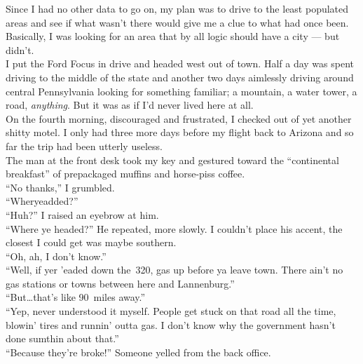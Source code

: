 \documentclass[a5paper]{scrartcl}
\begin{document}
Since I had no other data to go on, my plan was to drive to the least populated areas and see if what wasn't there would give me a clue to what had once been. Basically, I was looking for an area that by all logic should have a city --- but didn't.\\


I put the Ford Focus in drive and headed west out of town.
Half a day was spent driving to the middle of the state and another two days aimlessly driving around central Pennsylvania looking for something familiar; a mountain, a water tower, a road, \textit{anything}. But it was as if I'd never lived here at all.\\


On the fourth morning, discouraged and frustrated, I checked out of yet another shitty motel. I only had three more days before my flight back to Arizona and so far the trip had been utterly useless.\\


The man at the front desk took my key and gestured toward the \enquote{continental breakfast} of prepackaged muffins and 
horse-piss coffee.\\


\enquote{No thanks,} I grumbled.\\


\enquote{Wheryeadded?}\\


\enquote{Huh?} I raised an eyebrow at him.\\


\enquote{Where ye headed?} He repeated, more slowly. I couldn't place his accent, the closest I could get was maybe southern.\\


\enquote{Oh, ah, I don't know.}\\


\enquote{Well, if yer 'eaded down the~320, gas up before ya leave town. There ain't no gas stations or towns between here and Lannenburg.}\\


\enquote{But\dots that's like 90~miles away.}\\


\enquote{Yep, never understood it myself. People get stuck on that road all the time, blowin' tires and runnin' outta gas. I don't know why the government hasn't done sumthin about that.}\\


\enquote{Because they're broke!} Someone yelled from the back office.\\
\end{document}
